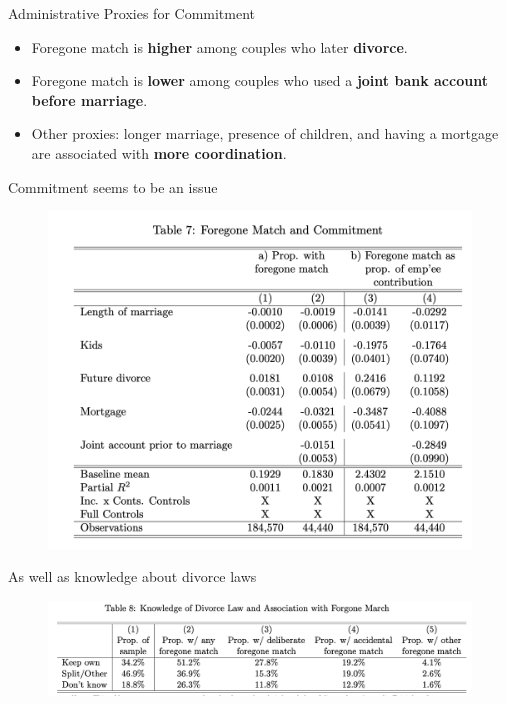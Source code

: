 \documentclass[11pt,notes=hide,aspectratio=169,mathserif]{beamer}
\begin{document}
\begin{frame}{Administrative Proxies for Commitment}
\small
\begin{itemize}
  \item Foregone match is \textbf{higher} among couples who later \textbf{divorce}.
  \item Foregone match is \textbf{lower} among couples who used a \textbf{joint bank account before marriage}.
  \item Other proxies: longer marriage, presence of children, and having a mortgage are associated with \textbf{more coordination}.
\end{itemize}
\end{frame}

\begin{frame}{Commitment seems to be an issue}
\small
\begin{figure}
\centering
\includegraphics[width=0.9\linewidth]{inputs/table7.png}
\end{figure}
\end{frame}

\begin{frame}{As well as knowledge about divorce laws}
\small
\begin{figure}
\centering
\includegraphics[width=0.9\linewidth]{inputs/table8.png}
\end{figure}
\end{frame}
\end{document}
